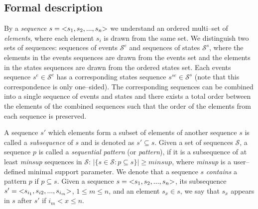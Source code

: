 \documentclass[runningheads,a4paper]{llncs}
\begin{document}
\subsection{Formal description}
By a \textit{sequence} $s=\text{\textless} s_1, s_2, ..., s_n\text{\textgreater}$ we understand an ordered multi--set of \textit{elements}, where each element $s_i$ is drawn from the same set.
We distinguish two sets of sequences: sequences of events $\mathcal{S}^e$ and sequences of states $\mathcal{S}^s$, where the elements in the events sequences are drawn from the events set and the elements in the states sequences are drawn from the ordered states set.
Each events sequence $s^e\in\mathcal{S}^e$ has a corresponding states sequence $s^{se}\in\mathcal{S}^s$ (note that this correspondence is only one--sided).
The corresponding sequences can be combined into a single sequence of events and states and there exists a total order between the elements of the combined sequences such that the order of the elements from each sequence is preserved.

A sequence $s'$ which elements form a subset of elements of another sequence $s$ is called a \textit{subsequence} of $s$ and is denoted as $s'\subseteq s$.
Given a set of sequences $\mathcal{S}$, a sequence $p$ is called a \textit{sequential pattern} (or \textit{pattern}), if it is a subsequence of at least \textit{minsup} sequences in $\mathcal{S}$: $|\{s\in\mathcal{S}:p\subseteq s\}|\geq\textit{minsup}$, where \textit{minsup} is a user--defined minimal support parameter.
We denote that a sequence $s$ \textit{contains} a pattern $p$ if $p\subseteq s$.
Given a sequence $s=\text{\textless} s_1,s_2,...,s_n\text{\textgreater}$, its subsequence $s'=\text{\textless} s_{i_1}, s_{i2}, ..., s_{i_m}\text{\textgreater}$, $1\leq m\leq n$, and an element $s_x\in s$, we say that $s_x$ appears in $s$ after $s'$ if $i_m<x\leq n$.
\end{document}
